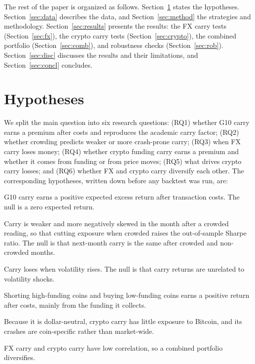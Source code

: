 \documentclass[11pt]{article}
\begin{document}
The rest of the paper is organized as follows. Section~\ref{sec:hyp} states the hypotheses. Section~\ref{sec:data} describes the data, and Section~\ref{sec:method} the strategies and methodology. Section~\ref{sec:results} presents the results: the FX carry tests (Section~\ref{sec:fx}), the crypto carry tests (Section~\ref{sec:crypto}), the combined portfolio (Section~\ref{sec:comb}), and robustness checks (Section~\ref{sec:rob}). Section~\ref{sec:disc} discusses the results and their limitations, and Section~\ref{sec:concl} concludes.

\section{Hypotheses}\label{sec:hyp}

We split the main question into six research questions: (RQ1) whether G10 carry earns a premium after costs and reproduces the academic carry factor; (RQ2) whether crowding predicts weaker or more crash-prone carry; (RQ3) when FX carry loses money; (RQ4) whether crypto funding carry earns a premium and whether it comes from funding or from price moves; (RQ5) what drives crypto carry losses; and (RQ6) whether FX and crypto carry diversify each other. The corresponding hypotheses, written down before any backtest was run, are:

\begin{description}\setlength{\itemsep}{0.2em}
\item[H-A1.] G10 carry earns a positive expected excess return after transaction costs. The null is a zero expected return.
\item[H-A2.] Carry is weaker and more negatively skewed in the month after a crowded reading, so that cutting exposure when crowded raises the out-of-sample Sharpe ratio. The null is that next-month carry is the same after crowded and non-crowded months.
\item[H-A3.] Carry loses when volatility rises. The null is that carry returns are unrelated to volatility shocks.
\item[H-B1.] Shorting high-funding coins and buying low-funding coins earns a positive return after costs, mainly from the funding it collects.
\item[H-B2.] Because it is dollar-neutral, crypto carry has little exposure to Bitcoin, and its crashes are coin-specific rather than market-wide.
\item[H-C.] FX carry and crypto carry have low correlation, so a combined portfolio diversifies.
\end{description}
\end{document}
